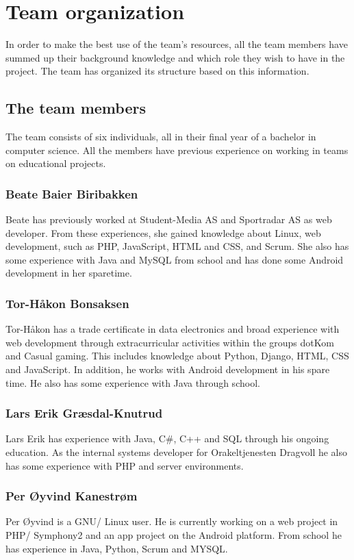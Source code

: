 \section{Team organization}
In order to make the best use of the team's resources, all the team members have summed up their background knowledge and which role they wish to have in the project. The team has organized its structure based on this information.

\subsection{The team members}
The team consists of six individuals, all in their final year of a bachelor in computer science. All the members have previous experience on working in teams on educational projects.

\subsubsection{Beate Baier Biribakken}
Beate has previously worked at Student-Media AS\cite{studentmedia} and Sportradar AS\cite{sportradar} as web developer. From these experiences, she gained knowledge about Linux, web development, such as PHP, JavaScript, HTML and CSS, and Scrum. She also has some experience with Java and MySQL from school and has done some Android development in her sparetime.

\subsubsection{Tor-Håkon Bonsaksen}
Tor-Håkon has a trade certificate in data electronics and broad experience with web development through extracurricular activities within the groups dotKom\cite{dotkom} and Casual gaming\cite{casualgaming}. This includes knowledge about Python, Django, HTML, CSS and JavaScript. In addition, he works with Android development in his spare time. He also has some experience with Java through school.

\subsubsection{Lars Erik Græsdal-Knutrud}
Lars Erik has experience with Java, C\#, C++ and SQL through his ongoing education. As the internal systems developer for Orakeltjenesten Dragvoll\cite{orakeltjenesten} he also has some experience with PHP and server environments. 

\subsubsection{Per Øyvind Kanestrøm}
Per Øyvind is a GNU/ Linux user. He is currently working on a web project in PHP/ Symphony2 and an app project on the Android platform. From school he has experience in Java, Python, Scrum and MYSQL.

